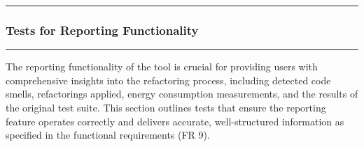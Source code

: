 \documentclass[12pt, titlepage]{article}
\newcommand{\colorrule}{\textcolor{BlueViolet}{\rule{\linewidth}{2pt}}}
\begin{document}
\newpage

\noindent
\colorrule

\subsubsection{Tests for Reporting Functionality}
\colorrule

\medskip

\noindent
The reporting functionality of the tool is crucial for providing
users with comprehensive insights into the refactoring process,
including detected code smells, refactorings applied, energy
consumption measurements, and the results of the original test suite.
This section outlines tests that ensure the reporting feature
operates correctly and delivers accurate, well-structured information
as specified in the functional requirements (FR 9).
\end{document}
